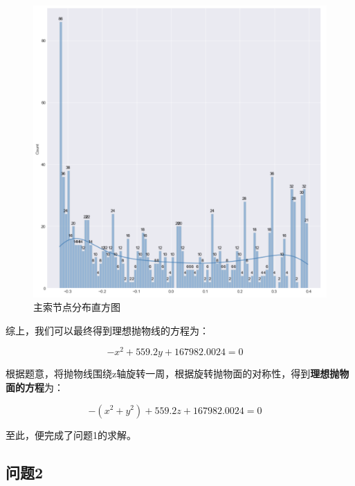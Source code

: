 \documentclass[withoutpreface,bwprint]{cumcmthesis} %
\begin{document}
\begin{figure}[H]
    \centering
    \includegraphics[scale=0.28]{images/xi1.png}
    \caption{主索节点分布直方图}
\end{figure}




综上，我们可以最终得到理想抛物线的方程为：

\begin{equation}
    -x^2+559.2y+167982.0024 =0\quad
\end{equation}

根据题意，将抛物线围绕z轴旋转一周，根据旋转抛物面的对称性，得到\textbf{理想抛物面的方程}为：

\begin{equation}
    -(x^2+y^2)+559.2z+167982.0024 =0\quad
\end{equation}

至此，便完成了问题1的求解。

\vspace{2em}








\subsection{问题2}
\end{document}
